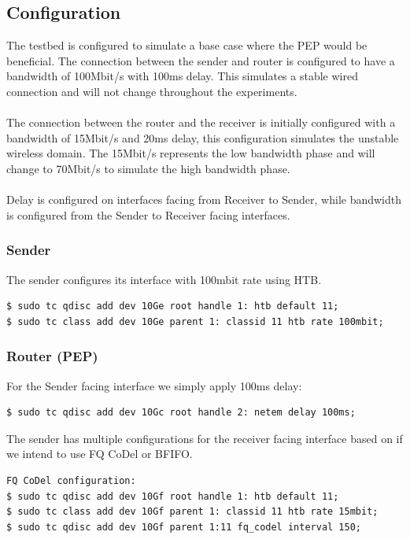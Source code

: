 \documentclass[a4paper,english, 11pt]{report}
\begin{document}
\subsection{Configuration}
The testbed is configured to simulate a base case where the PEP would be beneficial.
The connection between the sender and router is configured to have a bandwidth of 100Mbit/s with 100ms delay. This simulates a stable wired connection and will not change throughout the experiments.\\\\
The connection between the router and the receiver is initially configured with a bandwidth of 15Mbit/s and 20ms delay, this configuration simulates the unstable wireless domain. The 15Mbit/s represents the low bandwidth phase and will change to 70Mbit/s to simulate the high bandwidth phase.\\\\
Delay is configured on interfaces facing from Receiver to Sender, while bandwidth is configured from the Sender to Receiver facing interfaces. 

\subsubsection{Sender}
The sender configures its interface with 100mbit rate using HTB.
\begin{verbatim}
$ sudo tc qdisc add dev 10Ge root handle 1: htb default 11;
$ sudo tc class add dev 10Ge parent 1: classid 11 htb rate 100mbit;
\end{verbatim}

\subsubsection{Router (PEP)}
For the Sender facing interface we simply apply 100ms delay:
\begin{verbatim}
$ sudo tc qdisc add dev 10Gc root handle 2: netem delay 100ms;
\end{verbatim}

The sender has multiple configurations for the receiver facing interface based on if we intend to use FQ CoDel or BFIFO.

\begin{verbatim}
FQ CoDel configuration:
$ sudo tc qdisc add dev 10Gf root handle 1: htb default 11;
$ sudo tc class add dev 10Gf parent 1: classid 11 htb rate 15mbit;
$ sudo tc qdisc add dev 10Gf parent 1:11 fq_codel interval 150;
\end{verbatim}
\end{document}
